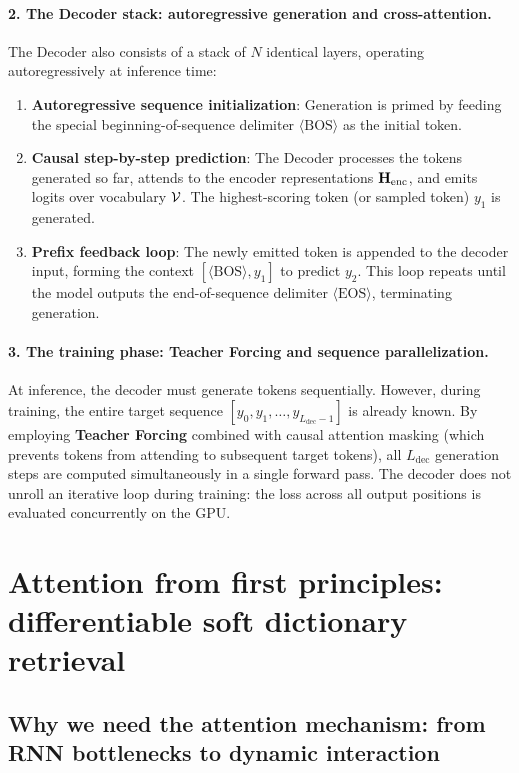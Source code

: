 \documentclass[../../main.tex]{subfiles}
\begin{document}
\paragraph{2. The Decoder stack: autoregressive generation and cross-attention.}
The Decoder also consists of a stack of $N$ identical layers, operating autoregressively at inference time:
\begin{enumerate}
    \item \textbf{Autoregressive sequence initialization}: Generation is primed by feeding the special beginning-of-sequence delimiter $\langle\text{BOS}\rangle$ as the initial token.
    \item \textbf{Causal step-by-step prediction}: The Decoder processes the tokens generated so far, attends to the encoder representations $\mathbf{H}_{\text{enc}}$, and emits logits over vocabulary $\mathcal{V}$. The highest-scoring token (or sampled token) $y_1$ is generated.
    \item \textbf{Prefix feedback loop}: The newly emitted token is appended to the decoder input, forming the context $[\langle\text{BOS}\rangle, y_1]$ to predict $y_2$. This loop repeats until the model outputs the end-of-sequence delimiter $\langle\text{EOS}\rangle$, terminating generation.
\end{enumerate}

\paragraph{3. The training phase: Teacher Forcing and sequence parallelization.}
At inference, the decoder must generate tokens sequentially. However, during training, the entire target sequence $[y_0, y_1, \dots, y_{L_{\text{dec}}-1}]$ is already known.
By employing \textbf{Teacher Forcing} combined with causal attention masking (which prevents tokens from attending to subsequent target tokens), all $L_{\text{dec}}$ generation steps are computed simultaneously in a single forward pass. The decoder does not unroll an iterative loop during training: the loss across all output positions is evaluated concurrently on the GPU.

\clearpage
\section{Attention from first principles: differentiable soft dictionary retrieval}
\label{sec:attention_first_principles}

\subsection{Why we need the attention mechanism: from RNN bottlenecks to dynamic interaction}
\label{subsec:why_we_need_attention}
\end{document}
